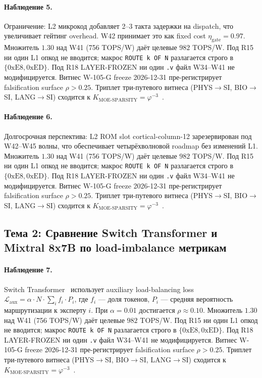 \paragraph{Наблюдение 5.} Ограничение: L2 микрокод добавляет 2--3 такта задержки на dispatch, что увеличивает гейтинг overhead. W42 принимает это как fixed cost $\eta_{\text{gate}} = 0{.}97$. Множитель $1{.}30$ над W41 (756 TOPS/W) даёт целевые $982$ TOPS/W. Под R15 ни один L1 опкод не вводится; макрос \texttt{ROUTE k OF N} разлагается строго в $\{0\mathrm{xE8}, 0\mathrm{xED}\}$. Под R18 LAYER-FROZEN ни один \texttt{.v} файл W34--W41 не модифицируется. Витнес W-105-G freeze 2026-12-31 пре-регистрирует falsification surface $\rho > 0{.}25$. Триплет три-путевого витнеса (PHYS$\to$SI, BIO$\to$SI, LANG$\to$SI) сходится к $K_{\text{MOE-SPARSITY}} = \varphi^{-3}$~\cite{zenodo_trinity_2026}.

\paragraph{Наблюдение 6.} Долгосрочная перспектива: L2 ROM slot cortical-column-12 зарезервирован под W42--W45 волны, что обеспечивает четырёхволновой roadmap без изменений L1. Множитель $1{.}30$ над W41 (756 TOPS/W) даёт целевые $982$ TOPS/W. Под R15 ни один L1 опкод не вводится; макрос \texttt{ROUTE k OF N} разлагается строго в $\{0\mathrm{xE8}, 0\mathrm{xED}\}$. Под R18 LAYER-FROZEN ни один \texttt{.v} файл W34--W41 не модифицируется. Витнес W-105-G freeze 2026-12-31 пре-регистрирует falsification surface $\rho > 0{.}25$. Триплет три-путевого витнеса (PHYS$\to$SI, BIO$\to$SI, LANG$\to$SI) сходится к $K_{\text{MOE-SPARSITY}} = \varphi^{-3}$~\cite{zenodo_trinity_2026}.

\subsection{Тема 2: Сравнение Switch Transformer и Mixtral 8x7B по load-imbalance метрикам}

\paragraph{Наблюдение 7.} Switch Transformer~\cite{switch_transformer2021} использует auxiliary load-balancing loss $\mathcal{L}_{\text{aux}} = \alpha \cdot N \cdot \sum_i f_i \cdot P_i$, где $f_i$ — доля токенов, $P_i$ — средняя вероятность маршрутизации к эксперту $i$. При $\alpha = 0{.}01$ достигается $\rho \approx 0{.}10$. Множитель $1{.}30$ над W41 (756 TOPS/W) даёт целевые $982$ TOPS/W. Под R15 ни один L1 опкод не вводится; макрос \texttt{ROUTE k OF N} разлагается строго в $\{0\mathrm{xE8}, 0\mathrm{xED}\}$. Под R18 LAYER-FROZEN ни один \texttt{.v} файл W34--W41 не модифицируется. Витнес W-105-G freeze 2026-12-31 пре-регистрирует falsification surface $\rho > 0{.}25$. Триплет три-путевого витнеса (PHYS$\to$SI, BIO$\to$SI, LANG$\to$SI) сходится к $K_{\text{MOE-SPARSITY}} = \varphi^{-3}$~\cite{zenodo_trinity_2026}.

